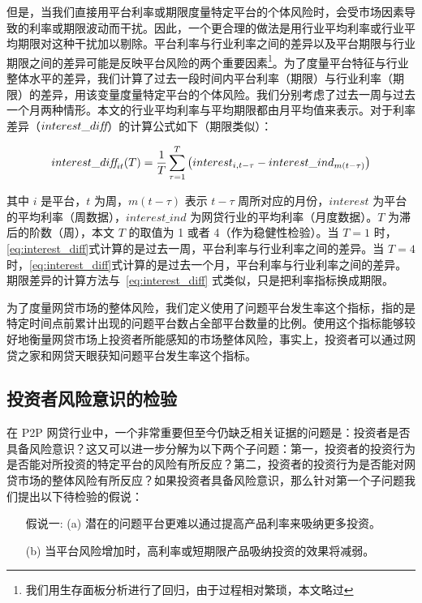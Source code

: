\documentclass[lang=cn,11pt]{elegantpaper}
\begin{document}
但是，当我们直接用平台利率或期限度量特定平台的个体风险时，会受市场因素导致的利率或期限波动而干扰。因此，一个更合理的做法是用行业平均利率或行业平均期限对这种干扰加以剔除。平台利率与行业利率之间的差异以及平台期限与行业期限之间的差异可能是反映平台风险的两个重要因素\footnote{我们用生存面板分析进行了回归，由于过程相对繁琐，本文略过}。为了度量平台特征与行业整体水平的差异，我们计算了过去一段时间内平台利率（期限）与行业利率（期限）的差异，用该变量度量特定平台的个体风险。我们分别考虑了过去一周与过去一个月两种情形。本文的行业平均利率与平均期限都由月平均值来表示。对于利率差异（$interest\_di\emph{f\kern0pt f}$）的计算公式如下（期限类似）：

\begin{equation}\label{eq:interest_diff}
      interest\_di\emph{f\kern0pt f}_{it}(T) = \frac{1}{T} \sum_{\tau = 1}^{T} \big(interest_{i,t-\tau} - interest\_ind_{m(t-\tau)}\big)
\end{equation}

其中 $i$ 是平台，$t$ 为周，$m(t-\tau)$ 表示 $t-\tau$ 周所对应的月份，$interest$ 为平台的平均利率（周数据），$interest\_ind$ 为网贷行业的平均利率（月度数据）。$T$ 为滞后的阶数（周），本文 $T$ 的取值为 1 或者 4（作为稳健性检验）。当 $T=1$ 时，\eqref{eq:interest_diff}式计算的是过去一周，平台利率与行业利率之间的差异。当 $T=4$ 时，\eqref{eq:interest_diff}式计算的是过去一个月，平台利率与行业利率之间的差异。期限差异的计算方法与~\eqref{eq:interest_diff} 式类似，只是把利率指标换成期限。

为了度量网贷市场的整体风险，我们定义使用了问题平台发生率这个指标，指的是特定时间点前累计出现的问题平台数占全部平台数量的比例。使用这个指标能够较好地衡量网贷市场上投资者所能感知的市场整体风险，事实上，投资者可以通过网贷之家和网贷天眼获知问题平台发生率这个指标。

\subsection{投资者风险意识的检验}

在 P2P 网贷行业中，一个非常重要但至今仍缺乏相关证据的问题是：投资者是否具备风险意识？这又可以进一步分解为以下两个子问题：第一，投资者的投资行为是否能对所投资的特定平台的风险有所反应？第二，投资者的投资行为是否能对网贷市场的整体风险有所反应？如果投资者具备风险意识，那么针对第一个子问题我们提出以下待检验的假说：

\begin{enumerate}[leftmargin=7.2em]
\kaishu
\item[假说一: (a)] 潜在的问题平台更难以通过提高产品利率来吸纳更多投资。
\item[(b)] 当平台风险增加时，高利率或短期限产品吸纳投资的效果将减弱。 
\end{enumerate}
\end{document}
